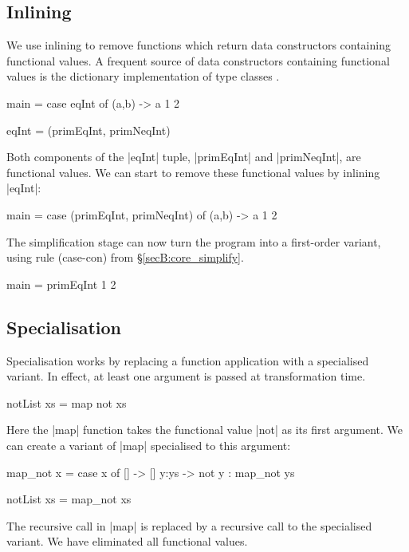 \subsection{Inlining}

We use inlining to remove functions which return data constructors containing functional values. A frequent source of data constructors containing functional values is the dictionary implementation of type classes \cite{wadler:type_classes}.

\begin{example}
\begin{code}
main = case  eqInt of
             (a,b) -> a 1 2

eqInt = (primEqInt, primNeqInt)
\end{code}

Both components of the |eqInt| tuple, |primEqInt| and |primNeqInt|, are functional values. We can start to remove these functional values by inlining |eqInt|:

\begin{code}
main = case  (primEqInt, primNeqInt) of
             (a,b) -> a 1 2
\end{code}

\noindent The simplification stage can now turn the program into a first-order variant, using rule (case-con) from \S\ref{secB:core_simplify}.

\begin{code}
main = primEqInt 1 2
\end{code}
\end{example}

\subsection{Specialisation}

Specialisation works by replacing a function application with a specialised variant. In effect, at least one argument is passed at transformation time.

\begin{example}
\begin{code}
notList xs = map not xs
\end{code}

\noindent Here the |map| function takes the functional value |not| as its first argument. We can create a variant of |map| specialised to this argument:

\begin{code}
map_not x = case  x of
                  []    -> []
                  y:ys  -> not y : map_not ys

notList xs = map_not xs
\end{code}

\noindent The recursive call in |map| is replaced by a recursive call to the specialised variant. We have eliminated all functional values.
\end{example}


